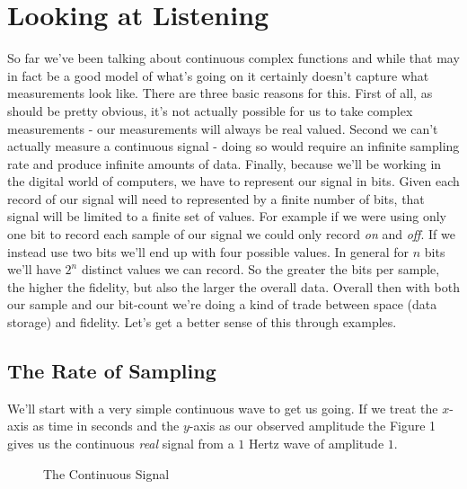 \documentclass[10pt,a5paper]{book}
\begin{document}
\section{Looking at Listening}
So far we've been talking about continuous complex functions and while that may in fact be a good model of what's going on it certainly doesn't capture what measurements look like. There are three basic reasons for this. First of all, as should be pretty obvious, it's not actually possible for us to take complex measurements - our measurements will always be real valued. Second we can't actually measure a continuous signal - doing so would require an infinite sampling rate and produce infinite amounts of data. Finally, because we'll be working in the digital world of computers, we have to represent our signal in bits. Given each record of our signal will need to represented by a finite number of bits, that signal will be limited to a finite set of values. For example if we were using only one bit to record each sample of our signal we could only record \textit{on} and \textit{off}. If we instead use two bits we'll end up with four possible values. In general for $n$ bits we'll have $2^n$ distinct values we can record. So the greater the bits per sample, the higher the fidelity, but also the larger the overall data. Overall then with both our sample and our bit-count we're doing a kind of trade between space (data storage) and fidelity. Let's get a better sense of this through examples.

\subsection{The Rate of Sampling}

We'll start with a very simple continuous wave to get us going. If we treat the $x$-axis as time in seconds and the $y$-axis as our observed amplitude the Figure 1 gives us the continuous \textit{real} signal from a $1$ Hertz wave of amplitude $1$. 

\begin{figure}[!htb]
\caption{\label{fig:my-label} The Continuous Signal}
\end{figure}
\end{document}

